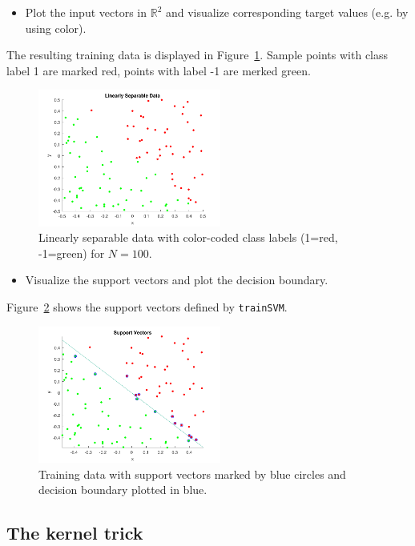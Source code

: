 \documentclass[a4]{article}
\begin{document}
\begin{itemize}
\item Plot the input vectors in $\mathbb{R}^2$ and visualize corresponding target values (e.g. by using color). 
\end{itemize}
The resulting training data is displayed in Figure~\ref{fig:linearData}. Sample points with class label 1 are marked red, points with label -1 are merked green.
\begin{figure}[!h]
	\begin{center}
		\centering
		\includegraphics[width=6cm]{../figures/linearData.pdf}
	\end{center}	
	\caption{Linearly separable data with color-coded class labels (1=red, -1=green) for $N=100$.}
	\label{fig:linearData}
\end{figure}

\begin{itemize}
\item Visualize the support vectors and plot the decision boundary.
\end{itemize}
Figure~\ref{fig:sv} shows the support vectors defined by \texttt{trainSVM}.
\begin{figure}[!h]
	\begin{center}
		\centering
		\includegraphics[width=6cm]{../figures/sv.pdf}
	\end{center}
	\caption{Training data with support vectors marked by blue circles and decision boundary plotted in blue.}
	\label{fig:sv}
\end{figure}


\subsection{The kernel trick}
\end{document}
